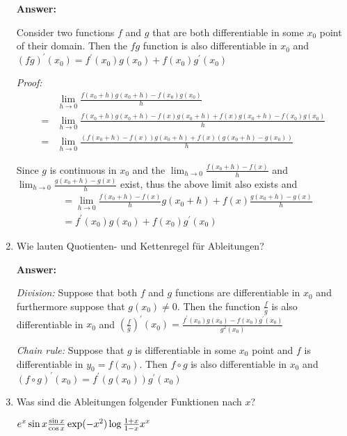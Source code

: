 \documentclass[11pt]{article}
\begin{document}
\begin{enumerate}
    \textbf{Answer:}

    Consider two functions $f$ and $g$ that are both differentiable in some $x_0$ point of their domain. Then the $f g$ function is also differentiable in $x_0$ and $(f g)^\prime(x_0) = f^\prime(x_0) g(x_0) + f(x_0) g^\prime(x_0)$
    
    \textit{Proof:}
    $$\begin{aligned}
        &\lim_{h\to0}\frac{f(x_0 + h)g(x_0 + h) - f(x_0)g(x_0)}{h} \\
        =&\lim_{h\to0}\frac{f(x_0 + h)g(x_0 + h) - f(x)g(x_0 + h) + f(x)g(x_0 + h)- f(x_0)g(x_0)}{h}\\
        =&\lim_{h\to0}\frac{(f(x_0 + h)- f(x))g(x_0 + h) + f(x)(g(x_0 + h)- g(x_0))}{h}
    \end{aligned}$$

    Since $g$ is continuous in $x_0$ and the $\lim_{h\to0}\frac{f(x_0 + h)- f(x)}{h}$ and $\lim_{h\to0}\frac{g(x_0 + h)- g(x)}{h}$ exist, thus the above limit also exists and 
    $$\begin{aligned}&= \lim_{h\to0}\frac{f(x_0 + h)- f(x)}{h} g(x_0 + h) + f(x)\frac{g(x_0 + h)- g(x)}{h} \\&=f^\prime(x_0) g(x_0) + f(x_0) g^\prime(x_0)\end{aligned}$$

    \item Wie lauten Quotienten- und Kettenregel für Ableitungen?
    
    \textbf{Answer:}

    \textit{Division:} Suppose that both $f$ and $g$ functions are differentiable in $x_0$ and furthermore suppose that $g(x_0) \neq 0$. Then the function $\frac{f}{g}$ is also differentiable in $x_0$ and $\left(\frac{f}{g}\right)^\prime(x_0) = \frac{f^\prime(x_0)g(x_0)-f(x_0)g^\prime(x_0)}{g^2(x_0)}$
    
    \textit{Chain rule:} Suppose that $g$ is differentiable in some $x_0$ point and $f$ is differentiable in $y_0 = f(x_0)$. Then $f \circ g$ is also differentiable in $x_0$ and $(f \circ g)^\prime(x_0) = f^\prime(g(x_0))g^\prime(x_0)$

    \item Was sind die Ableitungen folgender Funktionen nach $x$?
    
    \hspace*{\fill}
    $e^x \sin{x} \hfill \frac{\sin{x}}{\cos{x}}\hfill \exp(-x^2)\hfill \log{\frac{1+x}{1-x}}\hfill x^x$
    \hspace*{\fill}


\end{enumerate}
\end{document}
